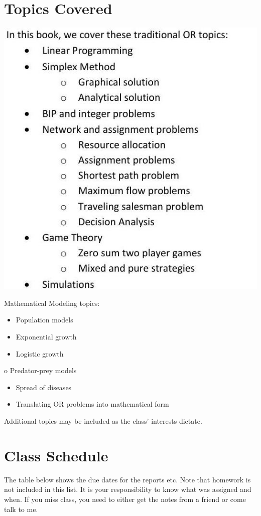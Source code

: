 \documentclass[10pt]{article}
\begin{document}
\section{Topics Covered}
\includegraphics[max width=\textwidth]{2022_07_05_5945264bba2a5f6ba667g-07}

Mathematical Modeling topics:

\begin{itemize}
  \item Population models

  \item Exponential growth

  \item Logistic growth

\end{itemize}
o Predator-prey models

\begin{itemize}
  \item Spread of diseases

  \item Translating OR problems into mathematical form

\end{itemize}
Additional topics may be included as the class' interests dictate.

\section{Class Schedule}
The table below shows the due dates for the reports etc. Note that homework is not included in this list. It is your responsibility to know what was assigned and when. If you miss class, you need to either get the notes from a friend or come talk to me.
\end{document}
